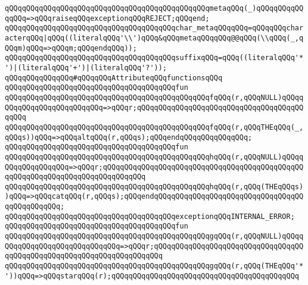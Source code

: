 \verb|qQQqqQQqqQQqqQQqqQQqqQQqqQQqqQQqqQQqqQQqqQQqqQQqmetaqQQq(_)qQQqqQQqqQQqqQQq=>qQQqraiseqQQqexceptionqQQqREJECT;qQQqend;|\newline
\newline
\verb|qQQqqQQqqQQqqQQqqQQqqQQqqQQqqQQqqQQqqQQqchar_metaqQQqqQQq=qQQqqQQqcharacterqQQq|\verb#|qQQq((literalqQQq'\\')qQQq&qQQqmetaqQQqqQQq@@qQQq(\\qQQq(_,qQQqm)qQQq=>qQQqm;qQQqendqQQq));#\newline
\newline
\verb|qQQqqQQqqQQqqQQqqQQqqQQqqQQqqQQqqQQqqQQqsuffixqQQq=qQQq((literalqQQq'*')|\verb#|(literalqQQq'+')|(literalqQQq'?'));#\newline
\newline
\verb|qQQqqQQqqQQqqQQq#qQQqqQQqAttributeqQQqfunctionsqQQq|\newline
\verb|qQQqqQQqqQQqqQQqqQQqqQQqqQQqqQQqqQQqqQQqfun|\newline
\verb|qQQqqQQqqQQqqQQqqQQqqQQqqQQqqQQqqQQqqQQqqQQqqQQqfqQQq(r,qQQqNULL)qQQqqQQqqQQqqQQqqQQqqQQqqQQq=>qQQqr;qQQqqQQqqQQqqQQqqQQqqQQqqQQqqQQqqQQqqQQqqQQq|\newline
\verb|qQQqqQQqqQQqqQQqqQQqqQQqqQQqqQQqqQQqqQQqqQQqqQQqfqQQq(r,qQQqTHEqQQq(_,qQQqs))qQQq=>qQQqaltqQQq(r,qQQqs);qQQqendqQQqqQQqqQQqqQQq;|\newline
\newline
\verb|qQQqqQQqqQQqqQQqqQQqqQQqqQQqqQQqqQQqqQQqfun|\newline
\verb|qQQqqQQqqQQqqQQqqQQqqQQqqQQqqQQqqQQqqQQqqQQqqQQqhqQQq(r,qQQqNULL)qQQqqQQqqQQqqQQqqQQq=>qQQqr;qQQqqQQqqQQqqQQqqQQqqQQqqQQqqQQqqQQqqQQqqQQqqQQqqQQqqQQqqQQqqQQqqQQqqQQqqQQqqQQq|\newline
\verb|qQQqqQQqqQQqqQQqqQQqqQQqqQQqqQQqqQQqqQQqqQQqqQQqhqQQq(r,qQQq(THEqQQqs))qQQq=>qQQqcatqQQq(r,qQQqs);qQQqendqQQqqQQqqQQqqQQqqQQqqQQqqQQqqQQqqQQqqQQqqQQqqQQq;|\newline
\newline
\verb|qQQqqQQqqQQqqQQqqQQqqQQqqQQqqQQqqQQqqQQqexceptionqQQqINTERNAL_ERROR;|\newline
\verb|qQQqqQQqqQQqqQQqqQQqqQQqqQQqqQQqqQQqqQQqfun|\newline
\verb|qQQqqQQqqQQqqQQqqQQqqQQqqQQqqQQqqQQqqQQqqQQqqQQqgqQQq(r,qQQqNULL)qQQqqQQqqQQqqQQqqQQqqQQqqQQqqQQq=>qQQqr;qQQqqQQqqQQqqQQqqQQqqQQqqQQqqQQqqQQqqQQqqQQqqQQqqQQqqQQqqQQqqQQqqQQqqQQq|\newline
\verb|qQQqqQQqqQQqqQQqqQQqqQQqqQQqqQQqqQQqqQQqqQQqqQQqgqQQq(r,qQQq(THEqQQq'*'))qQQq=>qQQqstarqQQq(r);qQQqqQQqqQQqqQQqqQQqqQQqqQQqqQQqqQQqqQQqqQQq|\newline
